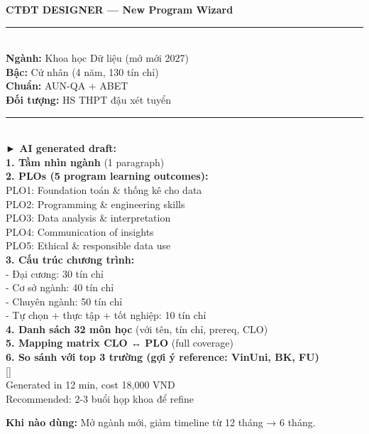 \documentclass[11pt,a4paper]{article}
\begin{document}
\begin{mockbox}
{\bfseries\color{ink} CTĐT DESIGNER --- New Program Wizard}\\[6pt]
\rule{\linewidth}{0.3pt}\\[4pt]
{\bfseries Ngành:} Khoa học Dữ liệu (mở mới 2027)\\
{\bfseries Bậc:} Cử nhân (4 năm, 130 tín chỉ)\\
{\bfseries Chuẩn:} AUN-QA + ABET\\
{\bfseries Đối tượng:} HS THPT đậu xét tuyển\\[6pt]
\rule{\linewidth}{0.3pt}\\[4pt]
{\bfseries\color{ink} ► AI generated draft:}\\[2pt]
{\bfseries 1. Tầm nhìn ngành} (1 paragraph)\\[2pt]
{\bfseries 2. PLOs (5 program learning outcomes):}\\
\quad PLO1: Foundation toán \& thống kê cho data\\
\quad PLO2: Programming \& engineering skills\\
\quad PLO3: Data analysis \& interpretation\\
\quad PLO4: Communication of insights\\
\quad PLO5: Ethical \& responsible data use\\[2pt]
{\bfseries 3. Cấu trúc chương trình:}\\
\quad - Đại cương: 30 tín chỉ\\
\quad - Cơ sở ngành: 40 tín chỉ\\
\quad - Chuyên ngành: 50 tín chỉ\\
\quad - Tự chọn + thực tập + tốt nghiệp: 10 tín chỉ\\[2pt]
{\bfseries 4. Danh sách 32 môn học} (với tên, tín chỉ, prereq, CLO)\\
{\bfseries 5. Mapping matrix CLO ↔ PLO} (full coverage)\\
{\bfseries 6. So sánh với top 3 trường (gợi ý reference: VinUni, BK, FU)}\\[6pt]
{[] }\\[6pt]
\textcolor{mid}{Generated in 12 min, cost 18,000 VND}\\
\textcolor{mid}{Recommended: 2-3 buổi họp khoa để refine}
\end{mockbox}

\textbf{Khi nào dùng:} Mở ngành mới, giảm timeline từ 12 tháng → 6 tháng.

\clearpage
\end{document}

